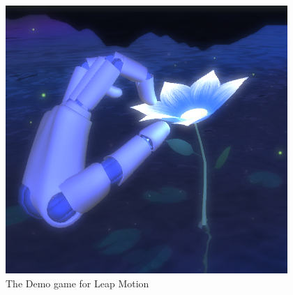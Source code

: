 \documentclass[11pt]{report}
\begin{document}
\begin{center}
	\begin{figure}[H]
		\begin{center}
			\includegraphics[scale=0.55]{pics/LeapMotion2}
				\caption{The Demo game for Leap Motion}
			\label{leap2}
		\end{center}
	\end{figure}
\end{center}
\end{document}
